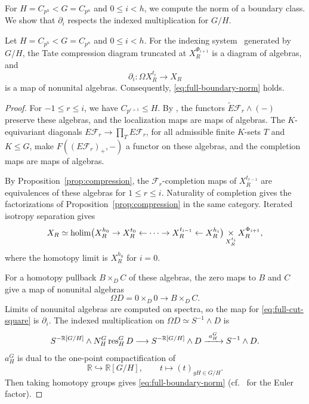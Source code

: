 For $H=C_{p^h}<G=C_{p^n}$ and $0\le i<h$, we compute the norm of a
boundary class. We show that $\partial_i$ respects the indexed
multiplication for $G/H$.

\begin{proposition}\label{prop:boundary-indexed-multiplications}
Let $H=C_{p^h}<G=C_{p^n}$ and $0\le i<h$.
For the indexing system~\cite[Definition~3.22]{BHOperadic} generated by $G/H$, the Tate compression
diagram truncated at $X_R^{\Phi_{i+1}}$ is a diagram of algebras, and
\[
\partial_i:\Omega X_R^{t_i}\longrightarrow X_R
\]
is a map of nonunital algebras.
Consequently, \eqref{eq:full-boundary-norm} holds.
\end{proposition}

\begin{proof}
For $-1\le r\le i$, we have $C_{p^{r+1}}\le H$.
By \cite[Theorem~6.1 and Corollary~6.5]{BHNorm}, the functors
$\widetilde E\mathcal F_r\wedge(-)$ preserve these algebras,
and the localization maps are maps of algebras.
The $K$-equivariant diagonals $E\mathcal F_r\to\prod_T E\mathcal F_r$,
for all admissible finite $K$-sets $T$ and $K\le G$,
make $F((E\mathcal F_r)_+,-)$ a functor on these algebras,
and the completion maps are maps of algebras.

By Proposition~\ref{prop:compression}, the $\mathcal F_r$-completion
maps of $X_R^{t_{r-1}}$ are equivalences of these algebras
for $1\le r\le i$.
Naturality of completion gives the factorizations of
Proposition~\ref{prop:compression} in the same category.
Iterated isotropy separation gives
\begin{equation}\label{eq:full-cut-square}
X_R\simeq
\operatorname*{holim}\bigl(X_R^{h_0}\to X_R^{t_0}\leftarrow\cdots\to
X_R^{t_{i-1}}\leftarrow X_R^{h_i}\bigr)
\mathop{\times}_{X_R^{t_i}}X_R^{\Phi_{i+1}},
\end{equation}
where the homotopy limit is $X_R^{h_0}$ for $i=0$.

For a homotopy pullback $B\times_D C$ of these algebras,
the zero maps to $B$ and $C$ give a map of nonunital algebras
\[
\Omega D=0\mathop{\times}_D0\longrightarrow B\times_D C.
\]
Limits of nonunital algebras are computed on spectra,
so the map for \eqref{eq:full-cut-square} is $\partial_i$.
The indexed multiplication on $\Omega D\simeq S^{-1}\wedge D$ is
\[
S^{-\mathbb R[G/H]}\wedge N_H^G\operatorname{res}_H^G D
\longrightarrow S^{-\mathbb R[G/H]}\wedge D
\xrightarrow{\ a_H^G\ }S^{-1}\wedge D.
\]
$a_H^G$ is dual to the one-point compactification of
\[
\mathbb R\hookrightarrow\mathbb R[G/H],
\qquad t\longmapsto(t)_{gH\in G/H}.
\]
Then taking homotopy groups gives \eqref{eq:full-boundary-norm}
(cf.\ \cite[Theorem~3.1.1]{Balderrama} for the Euler factor).
\end{proof}

